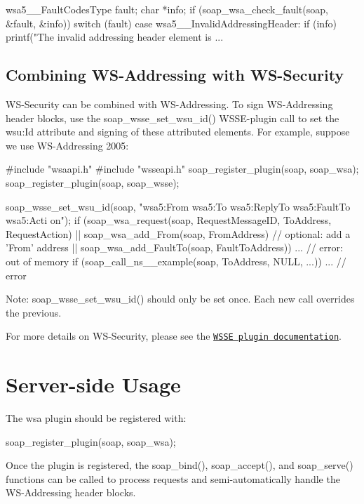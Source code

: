 \begin{DoxyCode}
wsa5__FaultCodesType fault;
char *info;
if (soap_wsa_check_fault(soap, &fault, &info))
{
  switch (fault)
  {
    case wsa5__InvalidAddressingHeader:
      if (info)
        printf("The invalid addressing header element is %
    ...
  }
}
\end{DoxyCode}
\hypertarget{wsa__0_wsa_2_5}{}\subsection{Combining WS-\/Addressing with WS-\/Security}\label{wsa__0_wsa_2_5}
WS-\/Security can be combined with WS-\/Addressing. To sign WS-\/Addressing header blocks, use the soap\_\-wsse\_\-set\_\-wsu\_\-id() WSSE-\/plugin call to set the wsu:Id attribute and signing of these attributed elements. For example, suppose we use WS-\/Addressing 2005:


\begin{DoxyCode}
#include "wsaapi.h"
#include "wsseapi.h"
soap_register_plugin(soap, soap_wsa);
soap_register_plugin(soap, soap_wsse);

soap_wsse_set_wsu_id(soap, "wsa5:From wsa5:To wsa5:ReplyTo wsa5:FaultTo wsa5:Acti
      on");
if (soap_wsa_request(soap, RequestMessageID, ToAddress, RequestAction)
 || soap_wsa_add_From(soap, FromAddress) // optional: add a 'From' address
 || soap_wsa_add_FaultTo(soap, FaultToAddress))
  ... // error: out of memory
if (soap_call_ns__example(soap, ToAddress, NULL, ...))
  ... // error
\end{DoxyCode}


Note: soap\_\-wsse\_\-set\_\-wsu\_\-id() should only be set once. Each new call overrides the previous.

For more details on WS-\/Security, please see the \href{../../wsse/html/index.html}{\tt WSSE plugin documentation}.\hypertarget{wsa__0_wsa_3}{}\section{Server-\/side Usage}\label{wsa__0_wsa_3}
The wsa plugin should be registered with:


\begin{DoxyCode}
soap_register_plugin(soap, soap_wsa);
\end{DoxyCode}


Once the plugin is registered, the soap\_\-bind(), soap\_\-accept(), and soap\_\-serve() functions can be called to process requests and semi-\/automatically handle the WS-\/Addressing header blocks.

